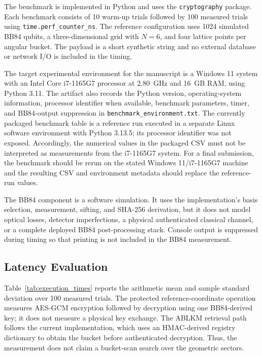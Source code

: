 \documentclass[journal,twocolumn]{IEEEtran}
\begin{document}
The benchmark is implemented in Python and uses the \texttt{cryptography} package. Each benchmark consists of 10 warm-up trials followed by 100 measured trials using \texttt{time.perf\_counter\_ns}. The reference configuration uses 1024 simulated BB84 qubits, a three-dimensional grid with $N=6$, and four lattice points per angular bucket. The payload is a short synthetic string and no external database or network I/O is included in the timing.

The target experimental environment for the manuscript is a Windows 11 system with an Intel Core i7-1165G7 processor at 2.80~GHz and 16~GB RAM, using Python 3.11. The artifact also records the Python version, operating-system information, processor identifier when available, benchmark parameters, timer, and BB84-output suppression in \texttt{benchmark\_environment.txt}. The currently packaged benchmark table is a reference run executed in a separate Linux software environment with Python 3.13.5; its processor identifier was not exposed. Accordingly, the numerical values in the packaged CSV must not be interpreted as measurements from the i7-1165G7 system. For a final submission, the benchmark should be rerun on the stated Windows 11/i7-1165G7 machine and the resulting CSV and environment metadata should replace the reference-run values.

The BB84 component is a software simulation. It uses the implementation's basis selection, measurement, sifting, and SHA-256 derivation, but it does not model optical losses, detector imperfections, a physical authenticated classical channel, or a complete deployed BB84 post-processing stack. Console output is suppressed during timing so that printing is not included in the BB84 measurement.

\subsection{Latency Evaluation}

Table~\ref{tab:execution_times} reports the arithmetic mean and sample standard deviation over 100 measured trials. The protected reference-coordinate operation measures AES-GCM encryption followed by decryption using one BB84-derived key; it does not measure a physical key exchange. The ABLKM retrieval path follows the current implementation, which uses an HMAC-derived registry dictionary to obtain the bucket before authenticated decryption. Thus, the measurement does not claim a bucket-scan search over the geometric sectors.
\end{document}

